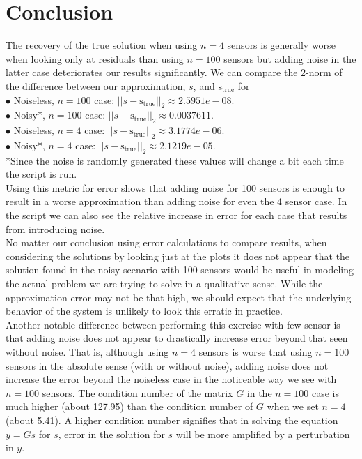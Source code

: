 \documentclass[11pt]{article}
\begin{document}
\section*{Conclusion}

The recovery of the true solution when using $n=4$ sensors is generally worse when looking only at residuals than using $n=100$ sensors but adding noise in the latter case deteriorates our results significantly. We can compare the 2-norm of the difference between our approximation, $s$, and $\text{s}_{\text{true}}$ for \\

$\bullet$ Noiseless, $n=100$ case: $||s-\text{s}_{\text{true}}||_2 \approx 2.5951e-08$.\\

$\bullet$ Noisy*, $n=100$ case: $||s-\text{s}_{\text{true}}||_2 \approx 0.0037611$.\\

$\bullet$ Noiseless, $n=4$ case: $||s-\text{s}_{\text{true}}||_2 \approx 3.1774e-06$.\\

$\bullet$ Noisy*, $n=4$ case: $||s-\text{s}_{\text{true}}||_2 \approx 2.1219e-05$.\\

*Since the noise is randomly generated these values will change a bit each time the script is run.\\

Using this metric for error shows that adding noise for 100 sensors is enough to result in a worse approximation than adding noise for even the 4 sensor case. In the script we can also see the relative increase in error for each case that results from introducing noise.\\

No matter our conclusion using error calculations to compare results, when considering the solutions by looking just at the plots it does not appear that the solution found in the noisy scenario with 100 sensors would be useful in modeling the actual problem we are trying to solve in a qualitative sense. While the approximation error may not be that high, we should expect that the underlying behavior of the system is unlikely to look this erratic in practice.\\

Another notable difference between performing this exercise with few sensor is that adding noise does not appear to drastically increase error beyond that seen without noise. That is, although using $n=4$ sensors is worse that using $n=100$ sensors in the absolute sense (with or without noise), adding noise does not increase the error beyond the noiseless case in the noticeable way we see with $n=100$ sensors. The condition number of the matrix $G$ in the $n=100$ case is much higher (about 127.95) than the condition number of $G$ when we set $n=4$ (about 5.41). A higher condition number signifies that in solving the equation $y = Gs$ for $s$, error in the solution for $s$ will be more amplified by a perturbation in $y$.\\ 
\end{document}
